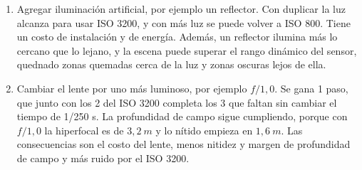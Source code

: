         \begin{enumerate}[label=\textbf{\arabic*)}]
            \item Agregar iluminación artificial, por ejemplo un reflector. Con duplicar la luz alcanza para usar ISO 3200, y con más luz se puede volver a ISO 800. Tiene un costo de instalación y de energía. Además, un reflector ilumina más lo cercano que lo lejano, y la escena puede superar el rango dinámico del sensor, quednado zonas quemadas cerca de la luz y zonas oscuras lejos de ella.
            
            \item Cambiar el lente por uno más luminoso, por ejemplo $f/1{,}0$. Se gana 1 paso, que junto con los 2 del ISO 3200 completa los 3 que faltan sin cambiar el tiempo de 1/250 s. La profundidad de campo sigue cumpliendo, porque con $f/1{,}0$ la hiperfocal es de $3{,}2\:m$ y lo nítido empieza en $1{,}6\:m$. Las consecuencias son el costo del lente, menos nitidez y margen de profundidad de campo y más ruido por el ISO 3200.
        \end{enumerate}

